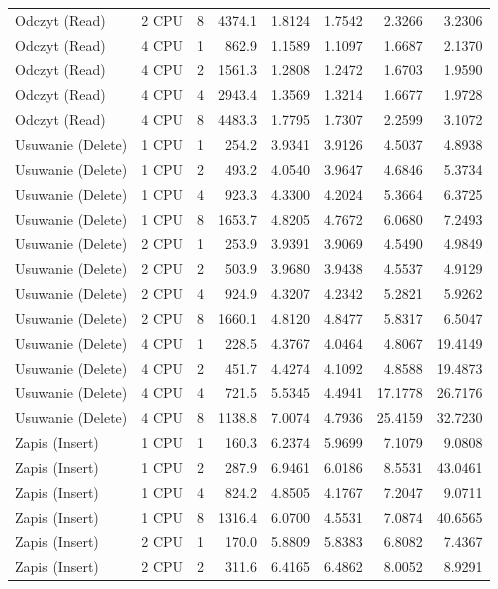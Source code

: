 \begin{table}[ht]
{\begin{tabular}{llcrrrrr}
Odczyt (Read) & 2 CPU & 8 & 4374.1 & 1.8124 & 1.7542 & 2.3266 & 3.2306 \\
Odczyt (Read) & 4 CPU & 1 & 862.9 & 1.1589 & 1.1097 & 1.6687 & 2.1370 \\
Odczyt (Read) & 4 CPU & 2 & 1561.3 & 1.2808 & 1.2472 & 1.6703 & 1.9590 \\
Odczyt (Read) & 4 CPU & 4 & 2943.4 & 1.3569 & 1.3214 & 1.6677 & 1.9728 \\
Odczyt (Read) & 4 CPU & 8 & 4483.3 & 1.7795 & 1.7307 & 2.2599 & 3.1072 \\
Usuwanie (Delete) & 1 CPU & 1 & 254.2 & 3.9341 & 3.9126 & 4.5037 & 4.8938 \\
Usuwanie (Delete) & 1 CPU & 2 & 493.2 & 4.0540 & 3.9647 & 4.6846 & 5.3734 \\
Usuwanie (Delete) & 1 CPU & 4 & 923.3 & 4.3300 & 4.2024 & 5.3664 & 6.3725 \\
Usuwanie (Delete) & 1 CPU & 8 & 1653.7 & 4.8205 & 4.7672 & 6.0680 & 7.2493 \\
Usuwanie (Delete) & 2 CPU & 1 & 253.9 & 3.9391 & 3.9069 & 4.5490 & 4.9849 \\
Usuwanie (Delete) & 2 CPU & 2 & 503.9 & 3.9680 & 3.9438 & 4.5537 & 4.9129 \\
Usuwanie (Delete) & 2 CPU & 4 & 924.9 & 4.3207 & 4.2342 & 5.2821 & 5.9262 \\
Usuwanie (Delete) & 2 CPU & 8 & 1660.1 & 4.8120 & 4.8477 & 5.8317 & 6.5047 \\
Usuwanie (Delete) & 4 CPU & 1 & 228.5 & 4.3767 & 4.0464 & 4.8067 & 19.4149 \\
Usuwanie (Delete) & 4 CPU & 2 & 451.7 & 4.4274 & 4.1092 & 4.8588 & 19.4873 \\
Usuwanie (Delete) & 4 CPU & 4 & 721.5 & 5.5345 & 4.4941 & 17.1778 & 26.7176 \\
Usuwanie (Delete) & 4 CPU & 8 & 1138.8 & 7.0074 & 4.7936 & 25.4159 & 32.7230 \\
Zapis (Insert) & 1 CPU & 1 & 160.3 & 6.2374 & 5.9699 & 7.1079 & 9.0808 \\
Zapis (Insert) & 1 CPU & 2 & 287.9 & 6.9461 & 6.0186 & 8.5531 & 43.0461 \\
Zapis (Insert) & 1 CPU & 4 & 824.2 & 4.8505 & 4.1767 & 7.2047 & 9.0711 \\
Zapis (Insert) & 1 CPU & 8 & 1316.4 & 6.0700 & 4.5531 & 7.0874 & 40.6565 \\
Zapis (Insert) & 2 CPU & 1 & 170.0 & 5.8809 & 5.8383 & 6.8082 & 7.4367 \\
Zapis (Insert) & 2 CPU & 2 & 311.6 & 6.4165 & 6.4862 & 8.0052 & 8.9291 \\

\end{tabular}}
\end{table}
